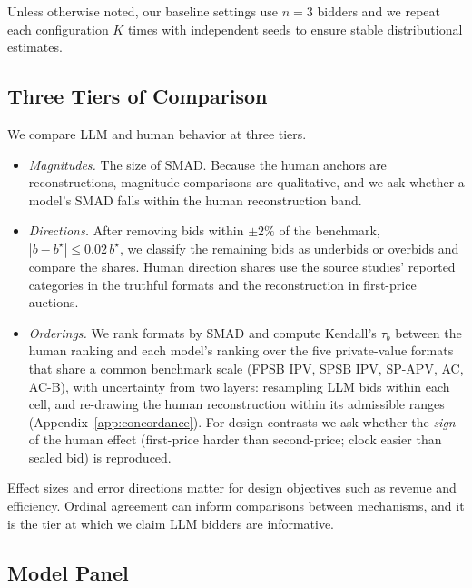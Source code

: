 \documentclass[acmsmall,screen,review]{acmart}
\begin{document}
Unless otherwise noted, our baseline settings use $n=3$ bidders and we repeat each configuration $K$ times with independent seeds to ensure stable distributional estimates.


\subsection{\texorpdfstring{Three Tiers of Comparison}{Three Tiers of Comparison}}\label{sec:tiers}

We compare LLM and human behavior at three tiers.
\begin{itemize}
  \item \emph{Magnitudes.} The size of SMAD. Because the human anchors are reconstructions, magnitude comparisons are qualitative, and we ask whether a model's SMAD falls within the human reconstruction band.
  \item \emph{Directions.} After removing bids within $\pm 2\%$ of the benchmark, $|b-b^\star| \le 0.02\, b^\star$, we classify the remaining bids as underbids or overbids and compare the shares. Human direction shares use the source studies' reported categories in the truthful formats and the reconstruction in first-price auctions.
  \item \emph{Orderings.} We rank formats by SMAD and compute Kendall's $\tau_b$ between the human ranking and each model's ranking over the five private-value formats that share a common benchmark scale (FPSB IPV, SPSB IPV, SP-APV, AC, AC-B), with uncertainty from two layers: resampling LLM bids within each cell, and re-drawing the human reconstruction within its admissible ranges (Appendix~\ref{app:concordance}). For design contrasts we ask whether the \emph{sign} of the human effect (first-price harder than second-price; clock easier than sealed bid) is reproduced.
\end{itemize}
Effect sizes and error directions matter for design objectives such as revenue and efficiency. Ordinal agreement can inform comparisons between mechanisms, and it is the tier at which we claim LLM bidders are informative.

\subsection{\texorpdfstring{Model Panel}{Model Panel}}\label{sec:models}
\end{document}
